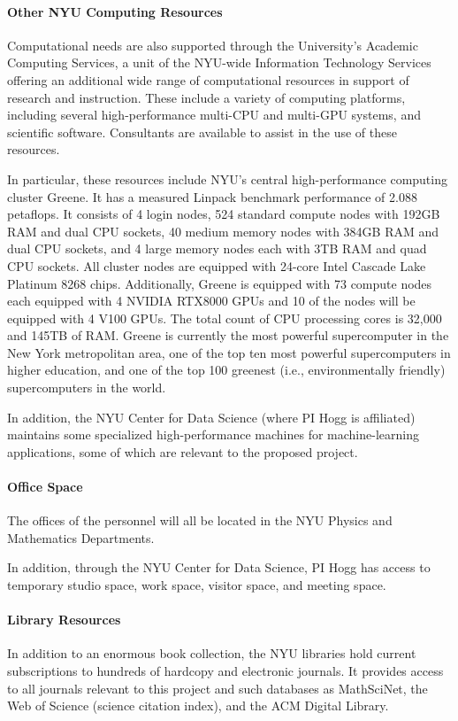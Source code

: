 \paragraph{Other NYU Computing Resources}
Computational needs are also supported through the University's
Academic Computing Services, a unit of the NYU-wide Information
Technology Services offering an additional wide range of computational
resources in support of research and instruction.  These include a
variety of computing platforms, including several high-performance
multi-CPU and multi-GPU systems, and scientific software.  Consultants are available
to assist in the use of these resources.

In particular, these resources include NYU's central high-performance computing
cluster Greene. It has a measured Linpack benchmark performance of 2.088 petaflops. It
consists of 4 login nodes, 524 standard compute nodes with 192GB RAM and dual CPU sockets,
40 medium memory nodes with 384GB RAM and dual CPU sockets, and 4 large memory nodes
each with 3TB RAM and quad CPU sockets. All cluster nodes are equipped with 24-core Intel
Cascade Lake Platinum 8268 chips. Additionally, Greene is equipped with 73 compute nodes
each equipped with 4 NVIDIA RTX8000 GPUs and 10 of the nodes will be equipped with 4
V100 GPUs. The total count of CPU processing cores is 32,000 and 145TB of RAM.
Greene is currently the most powerful supercomputer in the New York metropolitan area, one of
the top ten most powerful supercomputers in higher education, and one of the top 100 greenest
(i.e., environmentally friendly) supercomputers in the world.

In addition, the NYU Center for Data Science (where PI Hogg is affiliated)
maintains some specialized high-performance machines for machine-learning
applications, some of which are relevant to the proposed project.

\paragraph{Office Space}
The offices of the personnel will all be located in the NYU Physics and Mathematics Departments.

In addition, through the NYU Center for Data Science, PI Hogg has access to temporary studio space, work space, visitor space, and meeting space.

\paragraph{Library Resources}
In addition to an enormous book collection, the NYU libraries hold
current subscriptions to hundreds of hardcopy and electronic journals.
It provides access to all journals relevant to this project and such
databases as MathSciNet, the Web of Science (science citation index),
and the ACM Digital Library.

